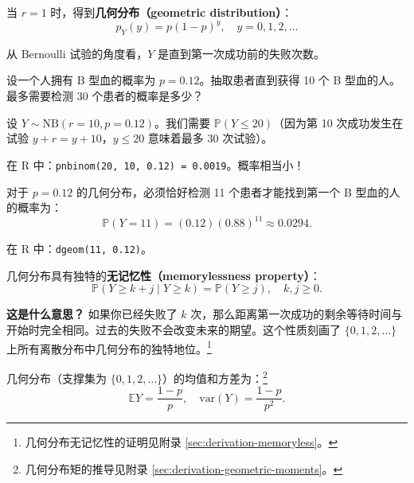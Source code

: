 当 $r=1$ 时，得到\textbf{几何分布（geometric distribution）}：
\begin{equation}\label{eq:geometric-pmf-ch3}
p_Y(y) = p(1-p)^{y}, \quad y = 0, 1, 2, \ldots
\end{equation}

从 Bernoulli 试验的角度看，$Y$ 是直到第一次成功前的失败次数。

\begin{example}[血型问题]\label{ex:blood-type-ch3}
设一个人拥有 B 型血的概率为 $p = 0.12$。抽取患者直到获得 10 个 B 型血的人。最多需要检测 30 个患者的概率是多少？

设 $Y \sim \text{NB}(r=10, p=0.12)$。我们需要 $\mathbb{P}(Y \leq 20)$（因为第 10 次成功发生在试验 $y+r = y+10$，$y \leq 20$ 意味着最多 30 次试验）。

在 R 中：\texttt{pnbinom(20, 10, 0.12) = 0.0019}。概率相当小！
\end{example}

\begin{example}[首次成功等待时间]\label{ex:first-success-ch3}
对于 $p = 0.12$ 的几何分布，必须恰好检测 11 个患者才能找到第一个 B 型血的人的概率为：
\[
\mathbb{P}(Y = 11) = (0.12)(0.88)^{11} \approx 0.0294.
\]

在 R 中：\texttt{dgeom(11, 0.12)}。
\end{example}

\begin{example}[几何分布的无记忆性]\label{th:geometric-memoryless-ch3}
几何分布具有独特的\textbf{无记忆性（memorylessness property）}：
\begin{equation}\label{eq:memoryless-property-ch3}
\mathbb{P}(Y \geq k+j \mid Y \geq k) = \mathbb{P}(Y \geq j), \quad k, j \geq 0.
\end{equation}
\end{example}

\textbf{这是什么意思？} 如果你已经失败了 $k$ 次，那么距离第一次成功的剩余等待时间与开始时完全相同。过去的失败不会改变未来的期望。这个性质刻画了 $\{0,1,2,\ldots\}$ 上所有离散分布中几何分布的独特地位。\footnote{几何分布无记忆性的证明见附录 \cref{sec:derivation-memoryless}。}

几何分布（支撑集为 $\{0,1,2,\ldots\}$）的均值和方差为：\footnote{几何分布矩的推导见附录 \cref{sec:derivation-geometric-moments}。}
\begin{equation}\label{eq:geometric-moments-ch3}
\mathbb{E}Y = \frac{1-p}{p}, \quad \text{var}(Y) = \frac{1-p}{p^{2}}.
\end{equation}

